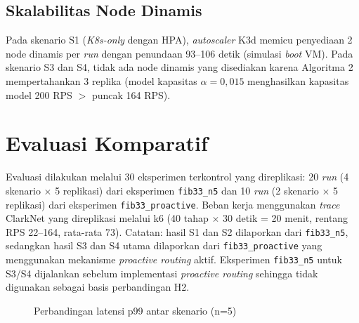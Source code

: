 \subsection{Skalabilitas Node Dinamis}

Pada skenario S1 (\emph{K8s-only} dengan HPA), \emph{autoscaler} K3d memicu penyediaan 2 node dinamis per \emph{run} dengan penundaan 93--106 detik (simulasi \emph{boot} VM). Pada skenario S3 dan S4, tidak ada node dinamis yang disediakan karena Algoritma 2 mempertahankan 3 replika (model kapasitas $\alpha = 0,015$ menghasilkan kapasitas model 200 RPS $>$ puncak 164 RPS).

\section{Evaluasi Komparatif}
\label{sec:comparative-evaluation}

Evaluasi dilakukan melalui 30 eksperimen terkontrol yang direplikasi: 20 \emph{run} (4 skenario $\times$ 5 replikasi) dari eksperimen \texttt{fib33\_n5} dan 10 \emph{run} (2 skenario $\times$ 5 replikasi) dari eksperimen \texttt{fib33\_proactive}. Beban kerja menggunakan \emph{trace} ClarkNet yang direplikasi melalui k6 (40 tahap $\times$ 30 detik = 20 menit, rentang RPS 22--164, rata-rata 73). Catatan: hasil S1 dan S2 dilaporkan dari \texttt{fib33\_n5}, sedangkan hasil S3 dan S4 utama dilaporkan dari \texttt{fib33\_proactive} yang menggunakan mekanisme \emph{proactive routing} aktif. Eksperimen \texttt{fib33\_n5} untuk S3/S4 dijalankan sebelum implementasi \emph{proactive routing} sehingga tidak digunakan sebagai basis perbandingan H2.

\begin{figure}[htbp]
    \centering
    \caption{Perbandingan latensi p99 antar skenario (n=5)}
    \label{fig:p99-comparison}
\end{figure}


